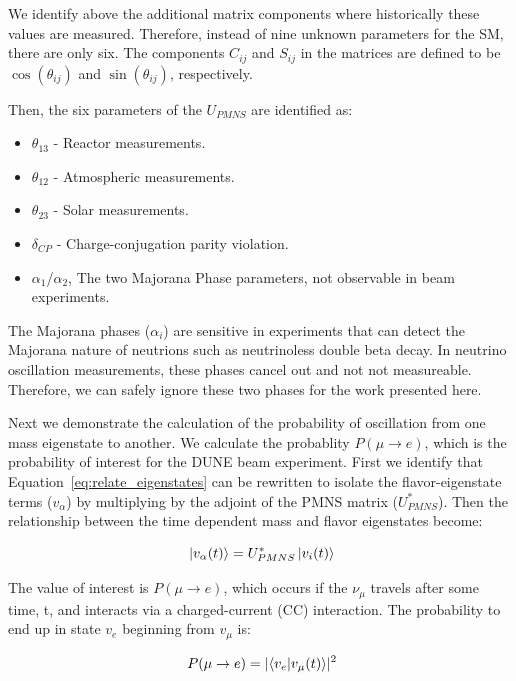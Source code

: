 We identify above the additional matrix components where historically these values are measured.
Therefore, instead of nine unknown parameters for the SM, there are only six.
The components $C_{ij}$ and $S_{ij}$ in the matrices are defined to be $\cos(\theta_{ij})$ and $\sin(\theta_{ij})$, respectively.

Then, the six parameters of the $U_{PMNS}$ are identified as:
\begin{itemize}
    \item $\theta_{13}$ - Reactor measurements.
    \item $\theta_{12}$ - Atmospheric measurements.
    \item $\theta_{23}$ - Solar measurements.
    \item $\delta_{CP}$ - Charge-conjugation parity violation.
    \item $\alpha_{1}$/$\alpha_{2}$, The two Majorana Phase parameters, not observable in beam experiments.
\end{itemize}

The Majorana phases ($\alpha_{i}$) are sensitive in experiments that can detect the Majorana nature of neutrions such as neutrinoless double beta decay.
In neutrino oscillation measurements, these phases cancel out and not not measureable.
Therefore, we can safely ignore these two phases for the work presented here.

Next we demonstrate the calculation of the probability of oscillation from one mass eigenstate to another.
We calculate the probablity $P(\mu \rightarrow e)$, which is the probability of interest for the DUNE beam experiment.
First we identify that Equation~\ref{eq:relate_eigenstates} can be rewritten to isolate the flavor-eigenstate terms ($v_{\alpha}$) by multiplying by the adjoint of the PMNS matrix ($U^{*}_{PMNS}$).
Then the relationship between the time dependent mass and flavor eigenstates become:

\begin{equation}~\label{eq:flavor_relation}
\ket{v_{\alpha}(t)} = U^{*}_{PMNS}\ket{v_{i}(t)}
\end{equation}

The value of interest is $P(\mu \rightarrow e)$, which occurs if the $\nu_{\mu}$ travels after some time, t, and interacts via a charged-current (CC) interaction.
The probability to end up in state $v_{e}$ beginning from $v_{\mu}$ is:

\begin{equation}~\label{eq:prob_calc1}
P(\mu \rightarrow e) = \lvert \braket{ v_{e} | v_{\mu} (t) }\rvert^{2}
\end{equation}

